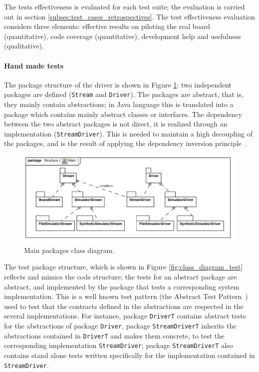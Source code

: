 \documentclass{article}
\newcommand{\lil}[1]{\texttt{\lstinline|#1|}}
\begin{document}
The tests effectiveness is evaluated for each test suite; the evaluation is carried out in section \ref{subsec:test_cases_retrospectives}.
The test effectiveness evaluation considers three elements: effective results on piloting the real board (quantitative), code coverage
(quantitative), development help and usefulness (qualitative).

\paragraph*{Hand made tests}

The package structure of the driver is shown in Figure \ref{fig:class_diagram_main}: two independent packages are defined (\lil{Stream} and \lil{Driver}).  
The packages are abstract, that is, they mainly contain abstractions; in Java language this is translated into a package which contains mainly abstract classes or interfaces.  
The dependency between the two abstract packages is not direct, it is realized through an implementation (\lil{StreamDriver}).
This is needed to maintain a high decoupling of the packages, and is the result of applying the dependency inversion principle~\cite{Martin1996}.

\begin{figure}[htb!]
  \centering
  \includegraphics[scale=0.7]{UML_model/Class_Diagram__Structure__Main}
  \caption{Main packages class diagram.}
  \label{fig:class_diagram_main}
\end{figure}

The test package structure, which is shown in Figure \ref{fig:class_diagram_test} reflects and mimics the code structure; the tests for an abstract package are abstract, and implemented by the package that tests a corresponding system implementation. 
This is a well known test pattern (the Abstract Test Pattern~\cite{Thomas2004}) used to test that the contracts defined in the abstractions are respected in the several implementations.  
For instance, package \lil{DriverT} contains abstract tests for the abstractions of package \lil{Driver}, package \lil{StreamDriverT} inherits the abstractions contained in \lil{DriverT} and makes them concrete, to test the corresponding implementation \lil{StreamDriver}; package \lil{StreamDriverT} also contains stand alone tests written specifically for the implementation contained in \lil{StreamDriver}.
\end{document}

